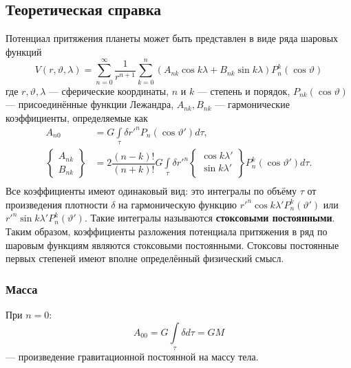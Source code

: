 \documentclass[11pt, a4paper,addpoints]{exam}
\theoremstyle{remark}
\renewcommand{\theta}{\vartheta}
\begin{document}
    \subsection*{\centering Теоретическая справка}
    Потенциал притяжения планеты может быть представлен в виде ряда шаровых функций
    \begin{equation*}
        V\left( r, \theta, \lambda \right) = \sum\limits_{n=0}^{\infty} \dfrac{1}{r^{n+1}}
        \sum\limits_{k=0}^{n}\left( A_{nk}\cos{k\lambda} + B_{nk}\sin{k\lambda} \right) P_n^k \left(
        \cos\theta \right)
    \end{equation*}
    где $r, \theta, \lambda$ --- сферические координаты, $n$ и $k$ --- степень и порядок,
    $P_{nk}\left( \cos{\theta} \right)$ --- присоединённые функции
    Лежандра, $A_{nk}, B_{nk}$ --- гармонические коэффициенты, определяемые как 
    \begin{equation*}
    \begin{aligned}
        A_{n0} &= G\int\limits_\tau \delta {r'}^n P_n \left( \cos{\theta'} \right) d\tau, \\
        \begin{Bmatrix}
            A_{nk} \\ B_{nk}
        \end{Bmatrix} &= 
        2 \dfrac{\left( n - k \right)!}{\left( n + k \right)!}
        G \int\limits_\tau \delta {r'}^n 
        \begin{Bmatrix}
            \cos{k\lambda'} \\
            \sin{k\lambda'} \\
        \end{Bmatrix}
        P_n^k \left( \cos{\theta'} \right) d\tau. \\
    \end{aligned}
    \end{equation*}
    Все коэффициенты имеют одинаковый вид: это интегралы по объёму $\tau$ от произведения плотности
    $\delta$ на гармоническую функцию ${r'}^n \cos{k\lambda'} P_n^k\left( \theta' \right)$ или
    ${r'}^n \sin{k\lambda'} P_n^k\left( \theta' \right)$. Такие интегралы называются  
    \textbf{стоксовыми постоянными}. Таким образом, коэффициенты разложения потенциала притяжения в
    ряд по шаровым функциям являются стоксовыми постоянными. Стоксовы постоянные первых степеней
    имеют вполне определённый физический смысл\cite{Ogorodova2013}.

    \subsubsection*{Масса}
    При $n = 0$:
    \begin{equation*}
        A_{00} = G \int\limits_\tau \delta d\tau = GM
    \end{equation*}
    --- произведение гравитационной постоянной на массу тела. 
\end{document}
